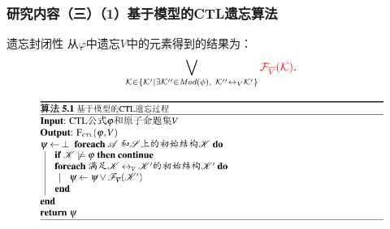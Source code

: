 \documentclass[aspectratio=1610, 9pt, CJK]{beamer}
\begin{document}
\begin{frame}
	\frametitle{研究内容（三）（1）基于模型的CTL遗忘算法}
		
		\begin{block}{遗忘封闭性}
			从$\varphi$中遗忘$V$中的元素得到的结果为：
			\begin{equation*}
				\bigvee_{{\cal K}\in  \{{\cal K}'\mid \exists {\cal K}''\in\textit{Mod}(\phi),\ {\cal K}''\leftrightarrow_V{\cal K}'\}} \textcolor{red}{{\cal F}_{\overline V}({\cal K})}.
			\end{equation*}
		\end{block}
	
		\begin{figure}
			\includegraphics[scale=0.6]{figures/model-basedAlg}
		\end{figure}
		
\end{frame}
\end{document}
